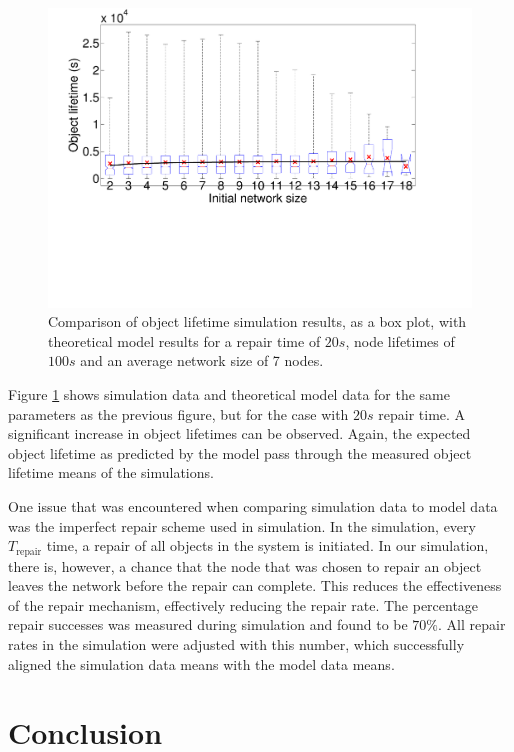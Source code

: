 \documentclass[10pt,a4paper,conference]{IEEEtran}
\begin{document}
\begin{figure}[htbp]
 \centering
 \includegraphics[clip=true, viewport=1.2cm 7.0cm 26.0cm 21cm, width=\columnwidth]{lifetime_simulation_model_20_100}
 \caption{Comparison of object lifetime simulation results, as a box plot, with theoretical model results for a repair time of $20 s$, node lifetimes of $100 s$ and an average network size of 7 nodes.}
 \label{fig_lifetime_simulation_model_20_100}
\end{figure}
%
Figure \ref{fig_lifetime_simulation_model_20_100} shows simulation data and theoretical model data for the same parameters as the previous figure, but for the case with $20 s$ repair time. A significant increase in object lifetimes can be observed. Again, the expected object lifetime as predicted by the model pass through the measured object lifetime means of the simulations.

One issue that was encountered when comparing simulation data to model data was the imperfect repair scheme used in simulation. In the simulation, every $T_{\textrm{repair}}$ time, a repair of all objects in the system is initiated. In our simulation, there is, however, a chance that the node that was chosen to repair an object leaves the network before the repair can complete. This reduces the effectiveness of the repair mechanism, effectively reducing the repair rate. The percentage repair successes was measured during simulation and found to be $70 \%$. All repair rates in the simulation were adjusted with this number, which successfully aligned the simulation data means with the model data means.

\section{Conclusion}
\label{conclusion}
\end{document}
